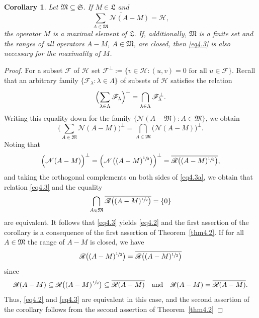\documentclass[12pt, a4paper, reqno, twoside]{amsart}
\numberwithin{equation}{section}
\newcommand{\frakS}{\mathfrak S}
\newcommand{\frakL}{\mathfrak L}
\newcommand{\frakM}{\mathfrak M}
\newtheorem{corollary}[theorem]{Corollary}
\theoremstyle{definition}
\theoremstyle{remark}
\theoremstyle{mystyle}
\begin{document}
\begin{corollary}
\label{cor4.3}
Let $\frakM\subseteq\frakS$. If $M\in\frakL$ and
\begin{equation}
\label{eq4.3}
\overline{\sum_{A\in\frakM}\mathscr N(A-M)} = \mathscr H,  
\end{equation}
the operator $M$ is a maximal element of $\frakL$. If, additionally,
$\frakM$ is a finite set and the ranges of all operators $A-M$,
$A\in\frakM$, are closed, then \eqref{eq4.3} is also necessary for the
maximality of $M$. 
\end{corollary}
\begin{proof}
For a subset $\mathscr F$ of $\mathscr H$ set $\mathscr F^{\perp}:=
\{v\in\mathscr H:(u,v)=0\text{ for all }u\in\mathscr F\}$. Recall that
an arbitrary family $\{\mathscr F_{\lambda}:\lambda\in\Lambda\}$ of
subsets of $\mathscr H$ satisfies the relation
\[
  \Bigl(\sum_{\lambda\in\Lambda} \mathscr F_{\lambda}\Bigr)^{\perp}
  = \bigcap_{\lambda\in\Lambda} \mathscr F_{\lambda}^{\perp}.
\]  
Writing this equality down for the family
$\{\mathscr N(A-\frakM):A\in\frakM\}$, we obtain  
\begin{equation}
\label{eq4.3a}
\Bigr(\sum_{A\in\frakM}\mathscr N(A-M)\Bigr)^{\perp} =
\bigcap_{A\in\frakM}\bigl(\mathscr N(A-M)\bigr)^{\perp}.
\end{equation}
Noting that
\[
\Bigl(\mathscr N(A-M)\Bigr)^{\perp} =
\Bigl(\mathscr N\bigl((A-M)^{\sfrac{1}{2}}\bigr)\Bigr)^{\perp} =
\overline{\mathscr R\bigl((A-M)^{\sfrac{1}{2}}\bigr)},
\]
and taking the orthogonal complements on both sides of \eqref{eq4.3a},
we obtain that relation \eqref{eq4.3} and the equality
\begin{equation}
\label{eq4.3b}
\bigcap_{A\in\frakM}
\overline{\mathscr R\bigl((A-M)^{\sfrac{1}{2}}\bigr)}
= \{0\}
\end{equation}
are equivalent. It follows that \eqref{eq4.3} yields \eqref{eq4.2} and
the first assertion of the corollary is a consequence of the first
assertion of Theorem~\ref{thm4.2}. If for all $A\in\frakM$ the range
of $A-M$ is closed, we have
\[
\mathscr R\bigl((A-M)^{\sfrac{1}{2}}\bigr) =
\overline{\mathscr R\bigl((A-M)^{\sfrac{1}{2}}\bigr)}
\]
since 
\[
\mathscr R(A-M) \subseteq \mathscr R\bigl((A-M)^{\sfrac{1}{2}}\bigr)
\subseteq\overline{\mathscr R(A-M)}
\quad\text{and}\quad
\mathscr R(A-M) = \overline{\mathscr R(A-M)}.
\]  
Thus, \eqref{eq4.2} and \eqref{eq4.3} are equivalent in this case, and
the second assertion of the corollary follows from the second
assertion of Theorem~\ref{thm4.2}
\end{proof}
\end{document}

